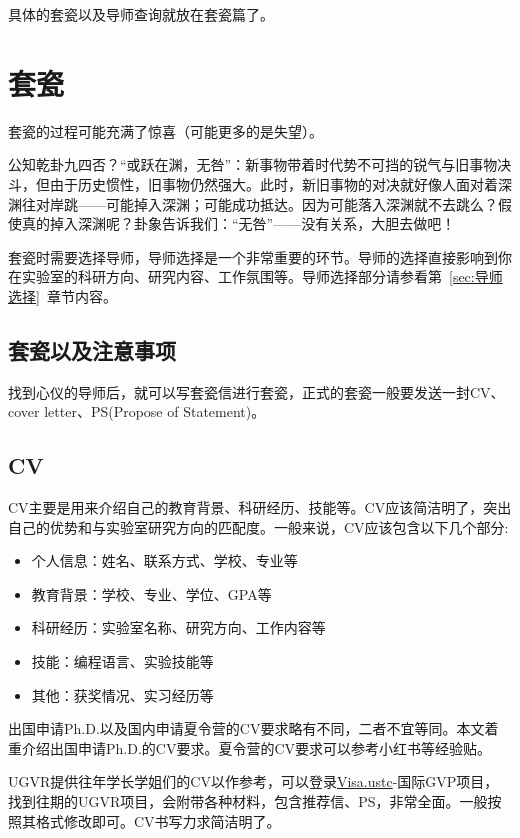 具体的套瓷以及导师查询就放在套瓷篇了。

\section{套瓷}
\begin{notebox}[写在前面]

套瓷的过程可能充满了惊喜（可能更多的是失望）。

公知乾卦九四否？“或跃在渊，无咎”：新事物带着时代势不可挡的锐气与旧事物决斗，但由于历史惯性，旧事物仍然强大。此时，新旧事物的对决就好像人面对着深渊往对岸跳——可能掉入深渊；可能成功抵达。因为可能落入深渊就不去跳么？假使真的掉入深渊呢？卦象告诉我们：“无咎”——没有关系，大胆去做吧！

\end{notebox}

套瓷时需要选择导师，导师选择是一个非常重要的环节。导师的选择直接影响到你在实验室的科研方向、研究内容、工作氛围等。导师选择部分请参看第~\ref{sec:导师选择}~章节内容。

\subsection*{套瓷以及注意事项}

找到心仪的导师后，就可以写套瓷信进行套瓷，正式的套瓷一般要发送一封CV、cover letter、PS(Propose of Statement)。

\subsection{CV}
CV主要是用来介绍自己的教育背景、科研经历、技能等。CV应该简洁明了，突出自己的优势和与实验室研究方向的匹配度。一般来说，CV应该包含以下几个部分:
\begin{itemize}
    \item 个人信息：姓名、联系方式、学校、专业等
    \item 教育背景：学校、专业、学位、GPA等
    \item 科研经历：实验室名称、研究方向、工作内容等
    \item 技能：编程语言、实验技能等
    \item 其他：获奖情况、实习经历等
\end{itemize}

出国申请Ph.D.以及国内申请夏令营的CV要求略有不同，二者不宜等同。本文着重介绍出国申请Ph.D.的CV要求。夏令营的CV要求可以参考小红书等经验贴。

UGVR提供往年学长学姐们的CV以作参考，可以登录\href{https://vista.ustc.edu.cn/}{Visa.ustc}-国际GVP项目，找到往期的UGVR项目，会附带各种材料，包含推荐信、PS，非常全面。一般按照其格式修改即可。CV书写力求简洁明了。

